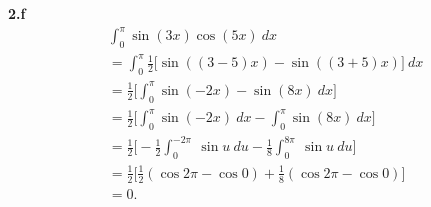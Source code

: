 \documentclass{report}
\begin{document}
    \pagebreak \bigbreak \noindent 
    \textbf{2.f}
    \bigbreak \noindent 
    \begin{align*}
        &\int_0^{\pi} \sin{(3x)}\cos{(5x)}\ dx \\
        &=\int_0^{\pi}\frac{1}{2}\bigg[\sin{((3-5)x)} - \sin{((3+5)x)}\bigg]\ dx \\
        &=\frac{1}{2}\bigg[\int_0^{\pi} \sin{(-2x) - \sin{(8x)}}\ dx\bigg] \\
        &= \frac{1}{2}\bigg[\int_0^{\pi} \sin{(-2x)}\ dx -\int_0^{\pi}\sin{(8x)}\ dx\bigg] \\
        &= \frac{1}{2}\bigg[-\frac{1}{2}\int_{0}^{-2\pi}\ \sin{u}\ du - \frac{1}{8}\int_{0}^{8\pi}\ \sin{u}\ du\bigg] \\
        &=\frac{1}{2}\bigg[\frac{1}{2}\left(\cos{2\pi}-\cos{0}\right) +\frac{1}{8}(\cos{2\pi}-\cos{0}) \bigg] \\
        &= 0
    .\end{align*}





    
    
\end{document}

